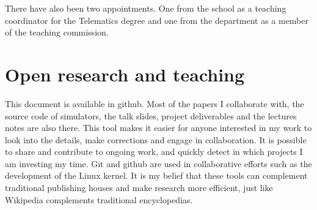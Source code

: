 \documentclass[a4paper,twocolumns]{article}%
\begin{document}
There have also been two appointments.
One from the school as a teaching coordinator for the Telematics degree and one from the department as a member of the teaching commission.



\section{Open research and teaching}

This document is available in github.
Most of the papers I collaborate with, the source code of simulators, the talk slides, project deliverables and the lectures notes are also there.
This tool makes it easier for anyone interested in my work to look into the details, make corrections and engage in collaboration.
It is possible to share and contribute to ongoing work, and quickly detect in which projects I am investing my time.
Git and github are used in collaborative efforts such as the development of the Linux kernel.
It is my belief that these tools can complement traditional publishing houses and make research more efficient, just like Wikipedia complements traditional encyclopedias. 




\end{document}
